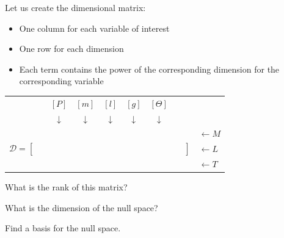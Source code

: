 \documentclass{workbook}
\begin{document}
\begin{slide}

\begin{parts}
\setcounter{partsitem}{1}

	\item Let us create the dimensional matrix:
	\begin{itemize}
		\item One column for each variable of interest
		\item One row for each dimension
		\item Each term contains the power of the corresponding dimension for the corresponding variable
	\end{itemize}
	
	\begin{center}
	\begin{tabular}{cccccccl}
		& $[P]$ & $[m]$ & $[l]$ & $[g]$ & $[\Theta]$ & \\
		& $\downarrow$ & $\downarrow$ & $\downarrow$ & $\downarrow$ & $\downarrow$ & \\
	\multirow{3}{*}{$\mathcal{D}=\left[\begin{matrix} \, \\ \,\\ \, \end{matrix}\right.$} 
		& & & & & & 
		\multirow{3}{*}{$\left.\begin{matrix} \, \\ \,\\ \, \end{matrix}\right]$}
		& $\leftarrow M$
		\\
		& & & & & & & $\leftarrow L$ \\
		& & & & & & & $\leftarrow T$
	\end{tabular}
	\end{center}
	
	\item What is the rank of this matrix?
	\item What is the dimension of the null space? %
	\item Find a basis for the null space.

\end{parts}

\end{slide}
\end{document}
